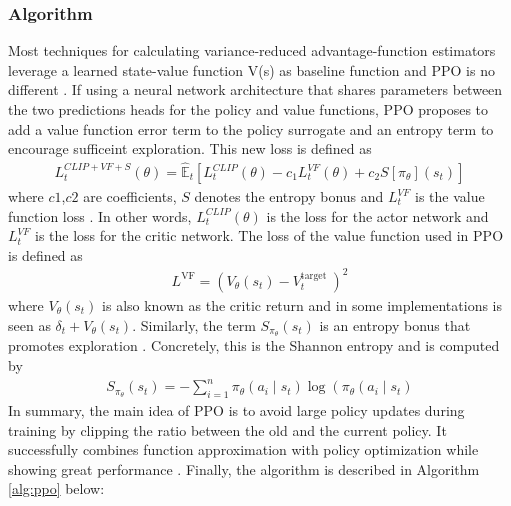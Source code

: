 \subsubsection{Algorithm}
Most techniques for calculating variance-reduced advantage-function estimators leverage a learned state-value function V(s) as baseline function and PPO is no different \cite{schulman2017proximal}. If using a neural network architecture that shares parameters between the two predictions heads for the policy and value functions, PPO proposes to add a value function error term to the policy surrogate and an entropy term to encourage sufficeint exploration. This new loss is defined as
\begin{align*}
    L_{t}^{C L I P+V F+S}(\theta)=\hat{\mathbb{E}}_{t}\left[L_{t}^{C L I P}(\theta)-c_{1} L_{t}^{V F}(\theta)+c_{2} S\left[\pi_{\theta}\right]\left(s_{t}\right)\right]
\end{align*}
where $c1$,$c2$ are coefficients, $S$ denotes the entropy bonus and $L_{t}^{V F}$ is the value function loss \cite{schulman2017proximal}. In other words, $L_{t}^{C L I P}(\theta)$ is the loss for the actor network and $L_{t}^{V F}$ is the loss for the critic network. The loss of the value function used in PPO is defined as
\begin{align*}
    L^{\mathrm{VF}}=\left(V_{\theta}\left(s_{t}\right)-V_{t}^{\text {target }}\right)^{2}
\end{align*}
where $V_{\theta}\left(s_{t}\right)$ is also known as the critic return and in some implementations is seen as $\delta_{t} + V_{\theta}\left(s_{t}\right)$. Similarly, the term $S_{\pi_{\theta}}\left(s_{t}\right)$ is an entropy bonus that promotes exploration \cite{schulman2017proximal}. Concretely, this is the Shannon entropy and is computed by
\begin{align*}
    S_{\pi_{\theta}}\left(s_{t}\right)=-\sum_{i=1}^{n} \pi_{\theta}\left(a_{i} \mid s_{t}\right) \log \left(\pi_{\theta}\left(a_{i} \mid s_{t}\right)\right.
\end{align*}
In summary, the main idea of PPO is to avoid large policy updates during training by clipping the ratio between the old and the current policy. It successfully combines function approximation with policy optimization while showing great performance \cite{schulman2017proximal}. Finally, the algorithm is described in Algorithm \ref{alg:ppo} below:

